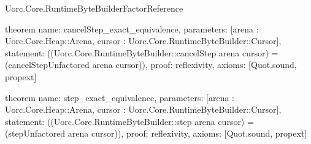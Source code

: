 \begin{lexlean}{Uorc.Core.RuntimeByteBuilderFactorReference}
\begin{semanticmodule}
theorem{
  name: cancelStep_exact_equivalence,
  parameters: [arena : Uorc.Core.Heap::Arena, cursor : Uorc.Core.RuntimeByteBuilder::Cursor],
  statement: ((Uorc.Core.RuntimeByteBuilder::cancelStep arena cursor) = (cancelStepUnfactored arena cursor)),
  proof: reflexivity{},
  axioms: [Quot.sound, propext]
}

theorem{
  name: step_exact_equivalence,
  parameters: [arena : Uorc.Core.Heap::Arena, cursor : Uorc.Core.RuntimeByteBuilder::Cursor],
  statement: ((Uorc.Core.RuntimeByteBuilder::step arena cursor) = (stepUnfactored arena cursor)),
  proof: reflexivity{},
  axioms: [Quot.sound, propext]
}
\end{semanticmodule}
\end{lexlean}
